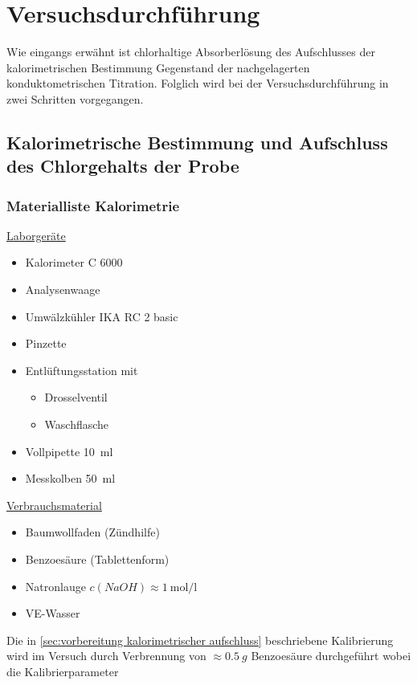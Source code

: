 \chapter{Versuchsdurchführung}
	Wie eingangs erwähnt ist chlorhaltige Absorberlösung des Aufschlusses der kalorimetrischen Bestimmung Gegenstand der nachgelagerten konduktometrischen Titration.
	Folglich wird bei der Versuchsdurchführung in zwei Schritten vorgegangen.
	\section{Kalorimetrische Bestimmung und Aufschluss des Chlorgehalts der Probe}\label{sec:kalorimeter bestimmung unbekannte probe}
		\subsection*{Materialliste Kalorimetrie}
			\underline{Laborgeräte}
			\begin{itemize}
				\item Kalorimeter C 6000
				\item Analysenwaage
				\item Umwälzkühler IKA RC 2 basic
				\item Pinzette
				\item Entlüftungsstation mit
					\begin{itemize}
						\item Drosselventil
						\item Waschflasche
					\end{itemize}
				\item Vollpipette \SI{10}{\milli\litre}
				\item Messkolben \SI{50}{\milli\litre}
			\end{itemize}

			\underline{Verbrauchsmaterial}
			\begin{itemize}
				\item Baumwollfaden (Zündhilfe)
				\item Benzoesäure (Tablettenform)
				\item Natronlauge \(c(NaOH) \approx \SI{1}{\mole\per\litre}\)
				\item VE-Wasser
			\end{itemize}
		Die in \cref{sec:vorbereitung kalorimetrischer aufschluss} beschriebene Kalibrierung wird im Versuch durch Verbrennung von \(\approx \SI{0,5}{g}\) Benzoesäure
		durchgeführt wobei die Kalibrierparameter

